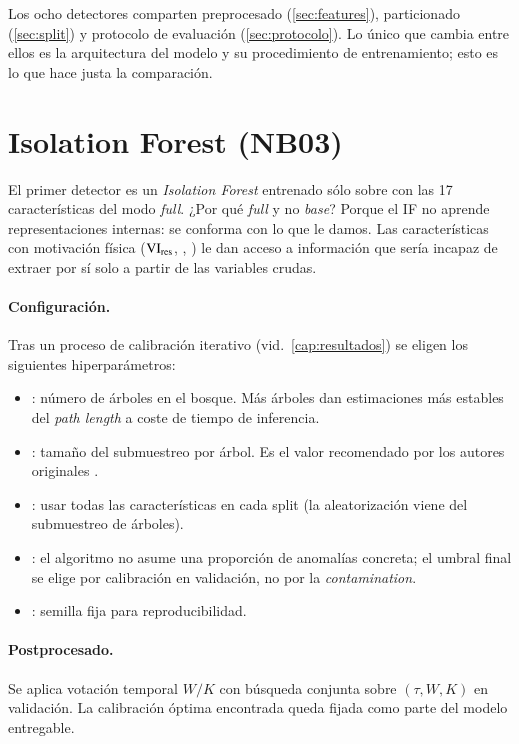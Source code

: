 Los ocho detectores comparten preprocesado (\cref{sec:features}), particionado (\cref{sec:split}) y protocolo de evaluación (\cref{sec:protocolo}). Lo único que cambia entre ellos es la arquitectura del modelo y su procedimiento de entrenamiento; esto es lo que hace justa la comparación.

\section{Isolation Forest (NB03)}
\label{sec:nb03}

El primer detector es un \textit{Isolation Forest} entrenado sólo sobre  con las 17 características del modo \emph{full}. ¿Por qué \emph{full} y no \emph{base}? Porque el IF no aprende representaciones internas: se conforma con lo que le damos. Las características con motivación física ($\mathrm{VI}_{\text{res}}$, , ) le dan acceso a información que sería incapaz de extraer por sí solo a partir de las variables crudas.

\paragraph{Configuración.} Tras un proceso de calibración iterativo (vid.\ \cref{cap:resultados}) se eligen los siguientes hiperparámetros:

\begin{itemize}[leftmargin=*,topsep=0pt]
  \item {}: número de árboles en el bosque. Más árboles dan estimaciones más estables del \emph{path length} a coste de tiempo de inferencia.
  \item {}: tamaño del submuestreo por árbol. Es el valor recomendado por los autores originales \cite{liu2008isolation}.
  \item {}: usar todas las características en cada split (la aleatorización viene del submuestreo de árboles).
  \item {}: el algoritmo no asume una proporción de anomalías concreta; el umbral final se elige por calibración en validación, no por la \emph{contamination}.
  \item {}: semilla fija para reproducibilidad.
\end{itemize}

\paragraph{Postprocesado.} Se aplica votación temporal $W/K$ con búsqueda conjunta sobre $(\tau, W, K)$ en validación. La calibración óptima encontrada queda fijada como parte del modelo entregable.

